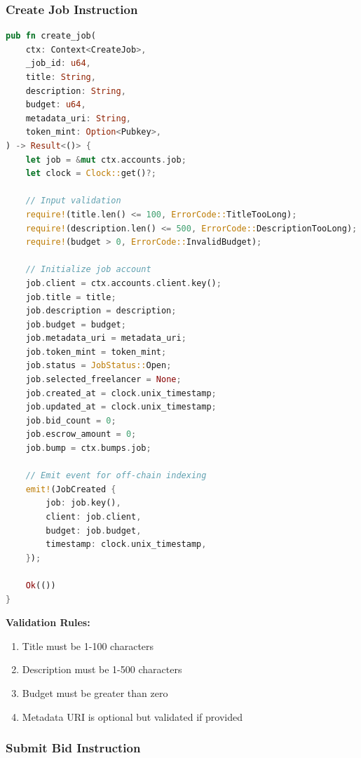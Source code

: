 \documentclass[a4paper,13pt,twoside]{report}
\theoremstyle{definition}
\begin{document}
\subsubsection{Create Job Instruction}

\begin{lstlisting}[language=Rust, caption=Create Job Implementation]
pub fn create_job(
    ctx: Context<CreateJob>,
    _job_id: u64,
    title: String,
    description: String,
    budget: u64,
    metadata_uri: String,
    token_mint: Option<Pubkey>,
) -> Result<()> {
    let job = &mut ctx.accounts.job;
    let clock = Clock::get()?;

    // Input validation
    require!(title.len() <= 100, ErrorCode::TitleTooLong);
    require!(description.len() <= 500, ErrorCode::DescriptionTooLong);
    require!(budget > 0, ErrorCode::InvalidBudget);

    // Initialize job account
    job.client = ctx.accounts.client.key();
    job.title = title;
    job.description = description;
    job.budget = budget;
    job.metadata_uri = metadata_uri;
    job.token_mint = token_mint;
    job.status = JobStatus::Open;
    job.selected_freelancer = None;
    job.created_at = clock.unix_timestamp;
    job.updated_at = clock.unix_timestamp;
    job.bid_count = 0;
    job.escrow_amount = 0;
    job.bump = ctx.bumps.job;

    // Emit event for off-chain indexing
    emit!(JobCreated {
        job: job.key(),
        client: job.client,
        budget: job.budget,
        timestamp: clock.unix_timestamp,
    });

    Ok(())
}
\end{lstlisting}

\textbf{Validation Rules:}
\begin{enumerate}
    \item Title must be 1-100 characters
    \item Description must be 1-500 characters
    \item Budget must be greater than zero
    \item Metadata URI is optional but validated if provided
\end{enumerate}

\subsubsection{Submit Bid Instruction}
\end{document}
